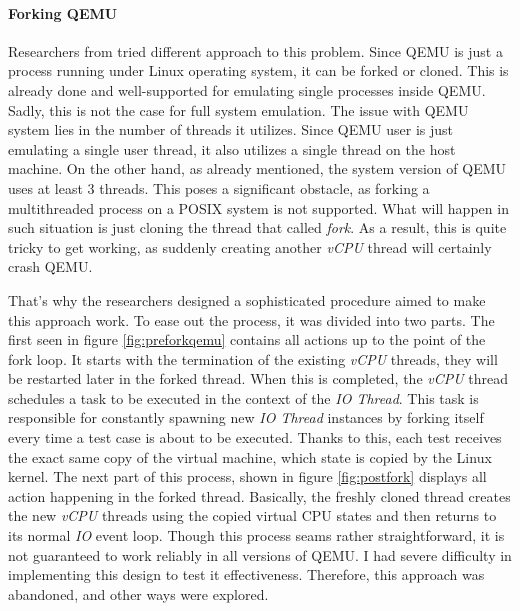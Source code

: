 \paragraph{Forking QEMU}
Researchers from \cite{triforceafl} tried different approach to this problem. Since QEMU is just a process running under Linux operating system, it can be forked or cloned. This is already done and well-supported for emulating single processes inside QEMU. Sadly, this is not the case for full system emulation. The issue with QEMU system lies in the number of threads it utilizes. Since QEMU user is just emulating a single user thread, it also utilizes a single thread on the host machine. On the other hand, as already mentioned, the system version of QEMU uses at least 3 threads. This poses a significant obstacle, as forking a multithreaded process on a POSIX system is not supported. What will happen in such situation is just cloning the thread that called \textit{fork}. As a result, this is quite tricky to get working, as suddenly creating another \textit{vCPU} thread will certainly crash QEMU.

That's why the researchers designed a sophisticated procedure aimed to make this approach work. To ease out the process, it was divided into two parts. The first seen in figure \ref{fig:preforkqemu} contains all actions up to the point of the fork loop. It starts with the termination of the existing \textit{vCPU} threads, they will be restarted later in the forked thread. When this is completed, the \textit{vCPU} thread schedules a task to be executed in the context of the \textit{IO Thread}. This task is responsible for constantly spawning new \textit{IO Thread} instances by forking itself every time a test case is about to be executed. Thanks to this, each test receives the exact same copy of the virtual machine, which state is copied by the Linux kernel. The next part of this process, shown in figure \ref{fig:postfork} displays all action happening in the forked thread. Basically, the freshly cloned thread creates the new \textit{vCPU} threads using the copied virtual CPU states and then returns to its normal \textit{IO} event loop. Though this process seams rather straightforward, it is not guaranteed to work reliably in all versions of QEMU. I had severe difficulty in implementing this design to test it effectiveness. Therefore, this approach was abandoned, and other ways were explored.

